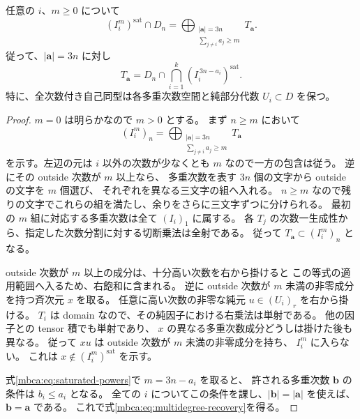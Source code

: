 \begin{lemma}[純商の核の飽和冪]
\label{mbca:lem:saturated-powers}
任意の $i$、$m\ge0$ について
\begin{equation}\label{mbca:eq:saturated-powers}
 (I_i^m)^{\mathrm{sat}}\cap D_n
   =\bigoplus_{\substack{|\boldsymbol a|=3n\\
                        \sum_{j\ne i}a_j\ge m}}T_{\boldsymbol a}.
\end{equation}
従って、$|\boldsymbol a|=3n$ に対し
\begin{equation}\label{mbca:eq:multidegree-recovery}
 T_{\boldsymbol a}
  =D_n\cap\bigcap_{i=1}^k
                (I_i^{\,3n-a_i})^{\mathrm{sat}}.
\end{equation}
特に、全次数付き自己同型は各多重次数空間と純部分代数
$U_i\subset D$ を保つ。
\end{lemma}
\begin{proof}
$m=0$ は明らかなので $m>0$ とする。
まず $n\ge m$ において
\[
 (I_i^m)_n
  =\bigoplus_{\substack{|\boldsymbol a|=3n\\
                       \sum_{j\ne i}a_j\ge m}}T_{\boldsymbol a}
\]
を示す。左辺の元は $i$ 以外の次数が少なくとも $m$ なので一方の包含は従う。
逆にその outside 次数が $m$ 以上なら、
多重次数を表す $3n$ 個の文字から outside の文字を $m$ 個選び、
それぞれを異なる三文字の組へ入れる。
$n\ge m$ なので残りの文字でこれらの組を満たし、余りをさらに三文字ずつに分けられる。
最初の $m$ 組に対応する多重次数は全て $(I_i)_1$ に属する。
各 $T_j$ の次数一生成性から、指定した次数分割に対する切断乗法は全射である。
従って $T_{\boldsymbol a}\subset(I_i^m)_n$ となる。

outside 次数が $m$ 以上の成分は、十分高い次数を右から掛けると
この等式の適用範囲へ入るため、右飽和に含まれる。
逆に outside 次数が $m$ 未満の非零成分を持つ斉次元 $x$ を取る。
任意に高い次数の非零な純元 $u\in(U_i)_r$ を右から掛ける。
$T_i$ は domain なので、その純因子における右乗法は単射である。
他の因子との tensor 積でも単射であり、
$x$ の異なる多重次数成分どうしは掛けた後も異なる。
従って $xu$ は outside 次数が $m$ 未満の非零成分を持ち、
$I_i^m$ に入らない。
これは $x\notin(I_i^m)^{\mathrm{sat}}$ を示す。

式\eqref{mbca:eq:saturated-powers}で $m=3n-a_i$ を取ると、
許される多重次数 $\boldsymbol b$ の条件は $b_i\le a_i$ となる。
全ての $i$ についてこの条件を課し、$|\boldsymbol b|=|\boldsymbol a|$ を使えば、
$\boldsymbol b=\boldsymbol a$ である。
これで式\eqref{mbca:eq:multidegree-recovery}を得る。
\end{proof}

